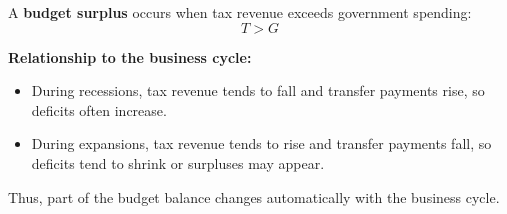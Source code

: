\documentclass[12pt]{article}
\begin{document}
\begin{enumerate}[label=\textbf{\arabic*.}, start=13]
A \textbf{budget surplus} occurs when tax revenue exceeds government spending:
\[
T > G
\]

\textbf{Relationship to the business cycle:}
\begin{itemize}
    \item During recessions, tax revenue tends to fall and transfer payments rise, so deficits often increase.
    \item During expansions, tax revenue tends to rise and transfer payments fall, so deficits tend to shrink or surpluses may appear.
\end{itemize}

Thus, part of the budget balance changes automatically with the business cycle.

\end{enumerate}
\end{document}
